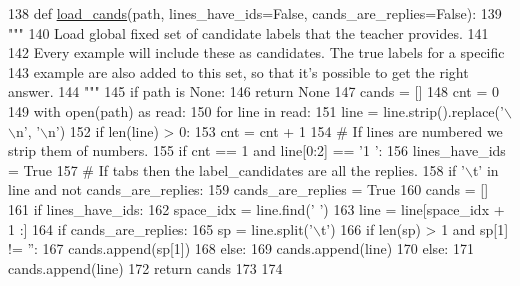 \begin{DoxyCode}
138 \textcolor{keyword}{def }\hyperlink{namespaceparlai_1_1utils_1_1misc_ad935ab0a9d49b897c5e3efdbe1c46c4d}{load\_cands}(path, lines\_have\_ids=False, cands\_are\_replies=False):
139     \textcolor{stringliteral}{"""}
140 \textcolor{stringliteral}{    Load global fixed set of candidate labels that the teacher provides.}
141 \textcolor{stringliteral}{}
142 \textcolor{stringliteral}{    Every example will include these as candidates. The true labels for a specific}
143 \textcolor{stringliteral}{    example are also added to this set, so that it's possible to get the right answer.}
144 \textcolor{stringliteral}{    """}
145     \textcolor{keywordflow}{if} path \textcolor{keywordflow}{is} \textcolor{keywordtype}{None}:
146         \textcolor{keywordflow}{return} \textcolor{keywordtype}{None}
147     cands = []
148     cnt = 0
149     with open(path) \textcolor{keyword}{as} read:
150         \textcolor{keywordflow}{for} line \textcolor{keywordflow}{in} read:
151             line = line.strip().replace(\textcolor{stringliteral}{'\(\backslash\)\(\backslash\)n'}, \textcolor{stringliteral}{'\(\backslash\)n'})
152             \textcolor{keywordflow}{if} len(line) > 0:
153                 cnt = cnt + 1
154                 \textcolor{comment}{# If lines are numbered we strip them of numbers.}
155                 \textcolor{keywordflow}{if} cnt == 1 \textcolor{keywordflow}{and} line[0:2] == \textcolor{stringliteral}{'1 '}:
156                     lines\_have\_ids = \textcolor{keyword}{True}
157                 \textcolor{comment}{# If tabs then the label\_candidates are all the replies.}
158                 \textcolor{keywordflow}{if} \textcolor{stringliteral}{'\(\backslash\)t'} \textcolor{keywordflow}{in} line \textcolor{keywordflow}{and} \textcolor{keywordflow}{not} cands\_are\_replies:
159                     cands\_are\_replies = \textcolor{keyword}{True}
160                     cands = []
161                 \textcolor{keywordflow}{if} lines\_have\_ids:
162                     space\_idx = line.find(\textcolor{stringliteral}{' '})
163                     line = line[space\_idx + 1 :]
164                     \textcolor{keywordflow}{if} cands\_are\_replies:
165                         sp = line.split(\textcolor{stringliteral}{'\(\backslash\)t'})
166                         \textcolor{keywordflow}{if} len(sp) > 1 \textcolor{keywordflow}{and} sp[1] != \textcolor{stringliteral}{''}:
167                             cands.append(sp[1])
168                     \textcolor{keywordflow}{else}:
169                         cands.append(line)
170                 \textcolor{keywordflow}{else}:
171                     cands.append(line)
172     \textcolor{keywordflow}{return} cands
173 
174 
\end{DoxyCode}
\mbox{\label{namespaceparlai_1_1utils_1_1misc_a7c97ef3250327bc549ac652a481be0cf}} 
